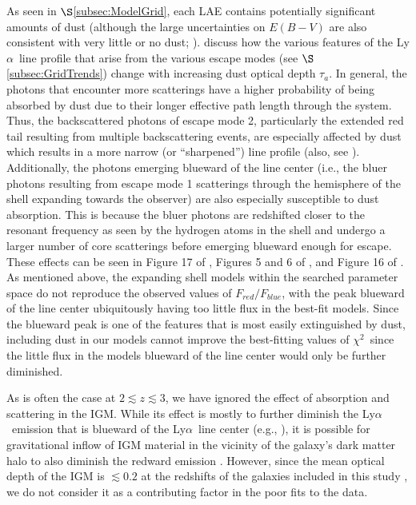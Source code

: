 \documentclass{emulateapj}
\newcommand{\lya}{Ly$\alpha$}
\def\chisq{$\chi^{2}$}
\begin{document}
As seen in $\S$\ref{subsec:ModelGrid}, each LAE contains potentially significant amounts of dust (although the large uncertainties on $E(B-V)$ are also consistent with very little or no dust; \citealp{blanc2011}). \citet{verhamme2006} discuss how the various features of the \lya\ line profile that arise from the various escape modes (see $\S$\ref{subsec:GridTrends}) change with increasing dust optical depth $\tau_{a}$. In general, the photons that encounter more scatterings have a higher probability of being absorbed by dust due to their longer effective path length through the system. Thus, the backscattered photons of escape mode 2, particularly the extended red tail resulting from multiple backscattering events, are especially affected by dust which results in a more narrow (or ``sharpened'') line profile (also, see \citealp{laursen2009}). Additionally, the photons emerging blueward of the line center (i.e., the bluer photons resulting from escape mode 1 scatterings through the hemisphere of the shell expanding towards the observer) are also especially susceptible to dust absorption. This is because the bluer photons are redshifted closer to the resonant frequency as seen by the hydrogen atoms in the shell and undergo a larger number of core scatterings before emerging blueward enough for escape. These effects can be seen in Figure 17 of \citet{verhamme2006}, Figures 5 and 6 of \citet{schaerer2011}, and Figure 16 of \citet{duval2013}. As mentioned above, the expanding shell models within the searched parameter space do not reproduce the observed values of $F_{red} / F_{blue}$, with the peak blueward of the line center ubiquitously having too little flux in the best-fit models. Since the blueward peak is one of the features that is most easily extinguished by dust, including dust in our models cannot improve the best-fitting values of \chisq\ since the little flux in the models blueward of the line center would only be further diminished.

As is often the case at $2\lesssim z \lesssim 3$, we have ignored the effect of absorption and scattering in the IGM.  While its effect is mostly to further diminish the \lya\ emission that is blueward of the \lya\ line center (e.g., \citealp{laursen2011}), it is possible for gravitational inflow of IGM material in the vicinity of the galaxy's dark matter halo to also diminish the redward emission \citep{dijkstra2006b}. However, since the mean optical depth of the IGM is $\lesssim0.2$ at the redshifts of the galaxies included in this study \citep{becker2013}, we do not consider it as a contributing factor in the poor fits to the data. 
\end{document}
